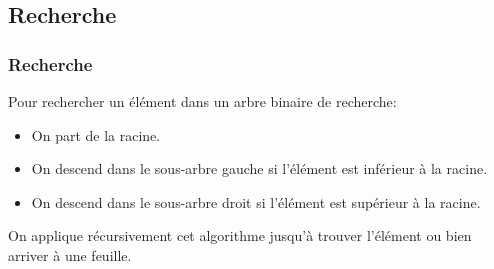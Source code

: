 \documentclass[svgnames,11pt]{beamer}
\begin{document}
\subsection{Recherche}
\begin{frame}
    \frametitle{Recherche}

    Pour rechercher un élément dans un arbre binaire de recherche:
    \begin{itemize}
        \item On part de la racine.
        \item On descend dans le sous-arbre gauche si l'élément est inférieur à la racine.
        \item On descend dans le sous-arbre droit si l'élément est supérieur à la racine.
    \end{itemize}
    On applique récursivement cet algorithme jusqu'à trouver l'élément ou bien arriver à une feuille.

\end{frame}
\end{document}
